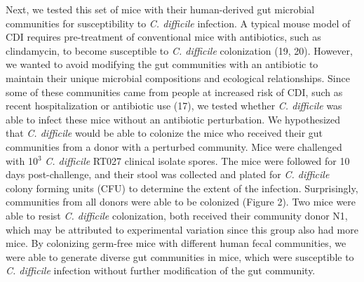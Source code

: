 \documentclass[
  12pt,
]{article}
\begin{document}
Next, we tested this set of mice with their human-derived gut microbial
communities for susceptibility to \emph{C. difficile} infection. A
typical mouse model of CDI requires pre-treatment of conventional mice
with antibiotics, such as clindamycin, to become susceptible to \emph{C.
difficile} colonization (19, 20). However, we wanted to avoid modifying
the gut communities with an antibiotic to maintain their unique
microbial compositions and ecological relationships. Since some of these
communities came from people at increased risk of CDI, such as recent
hospitalization or antibiotic use (17), we tested whether \emph{C.
difficile} was able to infect these mice without an antibiotic
perturbation. We hypothesized that \emph{C. difficile} would be able to
colonize the mice who received their gut communities from a donor with a
perturbed community. Mice were challenged with 10\(^{3}\) \emph{C.
difficile} RT027 clinical isolate spores. The mice were followed for 10
days post-challenge, and their stool was collected and plated for
\emph{C. difficile} colony forming units (CFU) to determine the extent
of the infection. Surprisingly, communities from all donors were able to
be colonized (Figure 2). Two mice were able to resist \emph{C.
difficile} colonization, both received their community donor N1, which
may be attributed to experimental variation since this group also had
more mice. By colonizing germ-free mice with different human fecal
communities, we were able to generate diverse gut communities in mice,
which were susceptible to \emph{C. difficile} infection without further
modification of the gut community.
\end{document}

